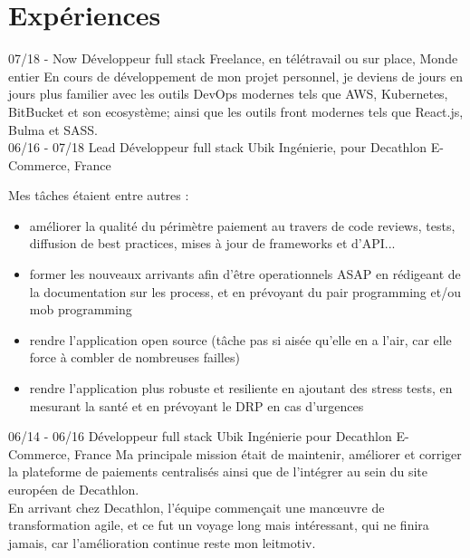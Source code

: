 \documentclass[]{friggeri-cv}
\begin{document}
\section{Expériences}
\begin{entrylist}
  \entry
    {07/18 - Now}
    {Développeur full stack}
    {Freelance, en télétravail ou sur place, Monde entier}
    {En cours de développement de mon projet personnel, je deviens de jours en jours plus familier avec les outils DevOps modernes tels que AWS, Kubernetes, BitBucket et son ecosystème; ainsi que les outils front modernes tels que React.js, Bulma et SASS.\\}
    \entry
    {06/16 - 07/18}
    {Lead Développeur full stack}
    {Ubik Ingénierie, pour Decathlon E-Commerce, France}
    {
Mes tâches étaient entre autres :
      \begin{itemize}
        \item améliorer la qualité du périmètre paiement au travers de code reviews, tests, diffusion de best practices, mises à jour de frameworks et d'API...
        \item former les nouveaux arrivants afin d'être operationnels ASAP en rédigeant de la documentation sur les process, et en prévoyant du pair programming et/ou mob programming
        \item rendre l'application open source (tâche pas si aisée qu'elle en a l'air, car elle force à combler de nombreuses failles)
        \item rendre l'application plus robuste et resiliente en ajoutant des stress tests, en mesurant la santé et en prévoyant le DRP en cas d'urgences
      \end{itemize}
}
    \entry
    {06/14 - 06/16}
    {Développeur full stack}
    {Ubik Ingénierie pour Decathlon E-Commerce, France}
    {Ma principale mission était de maintenir, améliorer et corriger la plateforme de paiements centralisés ainsi que de l'intégrer au sein du site européen de Decathlon.\\
En arrivant chez Decathlon, l'équipe commençait une man\oe uvre de transformation agile, et ce fut un voyage long mais intéressant, qui ne finira jamais, car l'amélioration continue reste mon leitmotiv.}
\end{entrylist}
\end{document}
